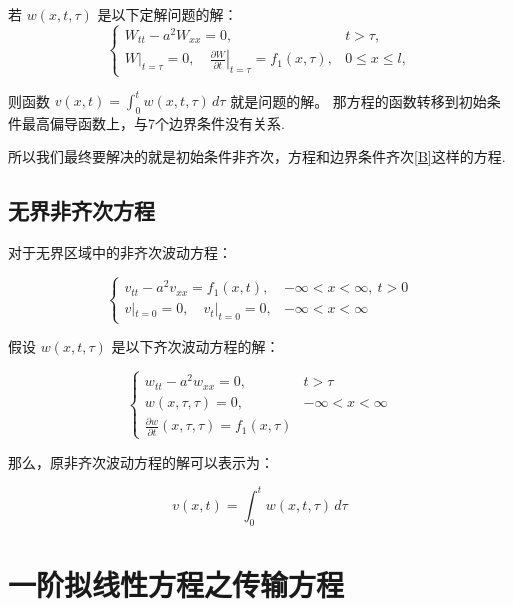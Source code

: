 \documentclass[12pt,a4paper]{article}
\numberwithin{subsection}{section}   %
\numberwithin{subsubsection}{subsection}
\theoremstyle{plain}
\theoremstyle{definition}
\theoremstyle{remark}
\theoremstyle{remark}
\begin{document}
	若 \( w(x, t, \tau) \) 是以下定解问题的解：
	\begin{equation}
		\begin{cases}
			W_{tt} - a^2 W_{xx} = 0, & t > \tau, \\
			W|_{t=\tau} = 0, \quad \left. \frac{\partial W}{\partial t} \right|_{t=\tau} = f_1(x, \tau), & 0 \leq x \leq l,
		\end{cases}
	\end{equation}
	
	则函数 \( v(x, t) = \int_0^t w(x, t, \tau) \, d\tau \) 就是问题的解。
	那方程的函数转移到初始条件最高偏导函数上，与7个边界条件没有关系.

所以我们最终要解决的就是初始条件非齐次，方程和边界条件齐次\eqref{B}这样的方程.
	
	
	

	\subsection{无界非齐次方程}
	对于无界区域中的非齐次波动方程：
	
\begin{equation}
	\begin{cases}
		v_{tt} - a^2 v_{xx} = f_1(x, t), & -\infty < x < \infty, \ t > 0 \\
		v|_{t=0} = 0, \quad v_t|_{t=0} = 0, & -\infty < x < \infty
	\end{cases}
\end{equation}
	
	假设 \(w(x, t, \tau)\) 是以下齐次波动方程的解：
	
\begin{equation}
	\begin{cases}
		w_{tt} - a^2 w_{xx} = 0, & t > \tau \\
		w(x, \tau, \tau) = 0, & -\infty < x < \infty \\
		\frac{\partial w}{\partial t}(x, \tau, \tau) = f_1(x, \tau)
	\end{cases}
\end{equation}
	
	那么，原非齐次波动方程的解可以表示为：
	
\begin{equation}
	v(x, t) = \int_0^t w(x, t, \tau) \, d\tau
\end{equation}
	

	
	
	
	
	
	\newpage
	\section{一阶拟线性方程之传输方程} 
\end{document}
